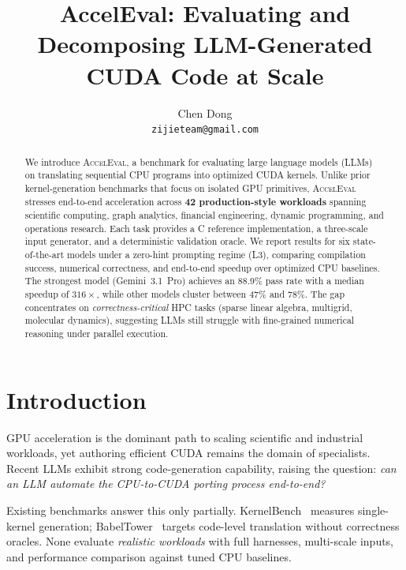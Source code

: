 \documentclass{article}
\title{AccelEval: Evaluating and Decomposing LLM-Generated CUDA Code at Scale}
\author{%
  Chen Dong \\
  \texttt{zijieteam@gmail.com} \\
}
\begin{document}
\maketitle


\begin{abstract}
We introduce \textsc{AccelEval}, a benchmark for evaluating large language models (LLMs) on translating sequential CPU programs into optimized CUDA kernels. Unlike prior kernel-generation benchmarks that focus on isolated GPU primitives, \textsc{AccelEval} stresses end-to-end acceleration across \textbf{42 production-style workloads} spanning scientific computing, graph analytics, financial engineering, dynamic programming, and operations research. Each task provides a C reference implementation, a three-scale input generator, and a deterministic validation oracle. We report results for six state-of-the-art models under a zero-hint prompting regime (L3), comparing compilation success, numerical correctness, and end-to-end speedup over optimized CPU baselines. The strongest model (Gemini~3.1~Pro) achieves an 88.9\% pass rate with a median speedup of $316\times$, while other models cluster between 47\% and 78\%. The gap concentrates on \emph{correctness-critical} HPC tasks (sparse linear algebra, multigrid, molecular dynamics), suggesting LLMs still struggle with fine-grained numerical reasoning under parallel execution.
\end{abstract}



\section{Introduction}
\label{sec:intro}

GPU acceleration is the dominant path to scaling scientific and industrial workloads, yet authoring efficient CUDA remains the domain of specialists. Recent LLMs exhibit strong code-generation capability, raising the question: \emph{can an LLM automate the CPU-to-CUDA porting process end-to-end?}

Existing benchmarks answer this only partially. KernelBench~\citep{kernelbench} measures single-kernel generation; BabelTower~\citep{babeltower} targets code-level translation without correctness oracles. None evaluate \emph{realistic workloads} with full harnesses, multi-scale inputs, and performance comparison against tuned CPU baselines.
\end{document}
